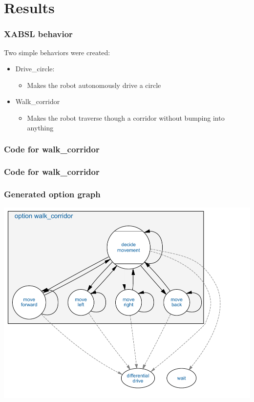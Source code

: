 \documentclass{beamer}
\newcommand{\slide}[2]
{
\begin{frame}
\frametitle{#1} 

#2

\end{frame}
}
\begin{document}
\section{Results}
\slide{XABSL behavior}
{
    Two simple behaviors were created:
    \begin{itemize}
        \item Drive\_circle:
        \begin{itemize}
           \item Makes the robot autonomously drive a circle
        \end{itemize}
        \item Walk\_corridor
        \begin{itemize}
            \item Makes the robot traverse though a corridor without bumping
            into anything
        \end{itemize}
    \end{itemize}
}
\begin{frame}[fragile]
\frametitle{Code for walk\_corridor}
    
\end{frame}

\begin{frame}[fragile]
\frametitle{Code for walk\_corridor}
    
\end{frame}
\slide{Generated option graph}
{
    \includegraphics[width=.9\textwidth]{option_walk_corridor.pdf}
}
\end{document}
